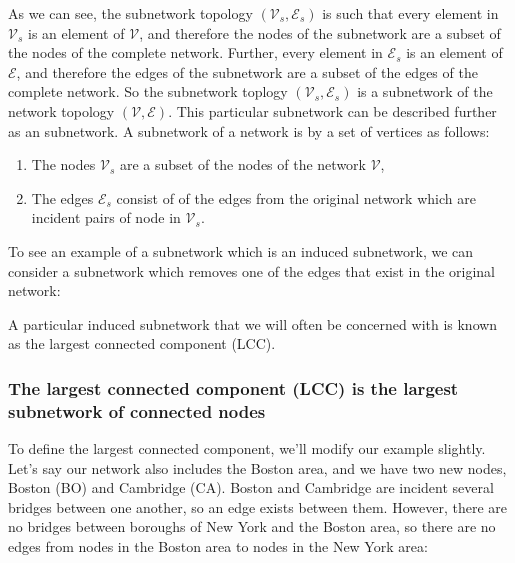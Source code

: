 \documentclass[letterpaper,10pt,english]{jupyterBook}
\begin{document}
\sphinxAtStartPar
As we can see, the subnetwork topology \((\mathcal V_s, \mathcal E_s)\) is such that every element in \(\mathcal V_s\) is an element of \(\mathcal V\), and therefore the nodes of the subnetwork are a subset of the nodes of the complete network. Further, every element in \(\mathcal E_s\) is an element of \(\mathcal E\), and therefore the edges of the subnetwork are a subset of the edges of the complete network. So the subnetwork toplogy \((\mathcal V_s, \mathcal E_s)\) is a subnetwork of the network topology \((\mathcal V, \mathcal E)\). This particular subnetwork can be described further as an  subnetwork. A subnetwork of a network is  by a set of vertices as follows:
\begin{enumerate}
%
\item {} 
\sphinxAtStartPar
The nodes \(\mathcal V_s\) are a subset of the nodes of the network \(\mathcal V\),

\item {} 
\sphinxAtStartPar
The edges \(\mathcal E_s\) consist of  of the edges from the original network which are incident pairs of node in \(\mathcal V_s\).

\end{enumerate}

\sphinxAtStartPar
To see an example of a subnetwork which is  an induced subnetwork, we can consider a subnetwork which removes one of the edges that exist in the original network:

\noindent{}

\sphinxAtStartPar
A particular induced subnetwork that we will often be concerned with is known as the largest connected component (LCC).


\subsubsection{The largest connected component (LCC) is the largest subnetwork of connected nodes}
\label{\detokenize{representations/ch4/properties-of-networks:the-largest-connected-component-lcc-is-the-largest-subnetwork-of-connected-nodes}}
\sphinxAtStartPar
To define the largest connected component, we’ll modify our example slightly. Let’s say our network also includes the Boston area, and we have two new nodes, Boston (BO) and Cambridge (CA). Boston and Cambridge are incident several bridges between one another, so an edge exists between them. However, there are no bridges between boroughs of New York and the Boston area, so there are no edges from nodes in the Boston area to nodes in the New York area:
\end{document}
